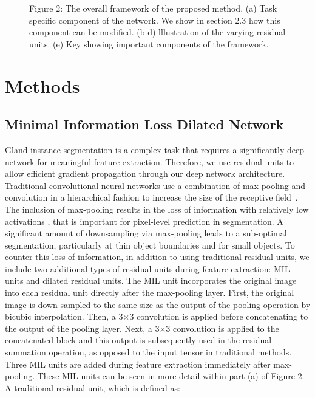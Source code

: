\documentclass[3p]{elsarticle}
\begin{document}
\begin{figure}[!t]
\centering
\captionsetup[subfigure]{labelformat=empty}
\caption*{Figure 2: The overall framework of the proposed method. (a) Task specific component of the network. We show in section 2.3 how this component can be modified. (b-d) lllustration of the varying residual units. (e) Key showing important components of the framework.}
\label{fig:detection}
\end{figure}

\section{Methods}
\subsection{Minimal Information Loss Dilated Network}
Gland instance segmentation is a complex task that requires a significantly deep network for meaningful feature extraction. Therefore, we use residual units to allow efficient gradient propagation through our deep network architecture. Traditional convolutional neural networks use a combination of max-pooling and convolution in a hierarchical fashion to increase the size of the receptive field~\citep{lecun2015deep}. The inclusion of max-pooling results in the loss of information with relatively low activations \citep{sabour2017dynamic}, that is important for pixel-level prediction in segmentation. A significant amount of downsampling via max-pooling leads to a sub-optimal segmentation, particularly at thin object boundaries and for small objects. To counter this loss of information, in addition to using traditional residual units,  we include two additional types of residual units during feature extraction: MIL units and dilated residual units. The MIL unit incorporates the original image into each residual unit directly after the max-pooling layer. First, the original image is down-sampled to the same size as the output of the pooling operation by bicubic interpolation. Then, a 3$\times$3 convolution is applied before concatenating to the output of the pooling layer. Next, a 3$\times$3 convolution is applied to the concatenated block and this output is subsequently used in the residual summation operation, as opposed to the input tensor in traditional methods. Three MIL units are added during feature extraction immediately after max-pooling. These MIL units can be seen in more detail within part (a) of Figure 2. A traditional residual unit, which is defined as:
\end{document}
